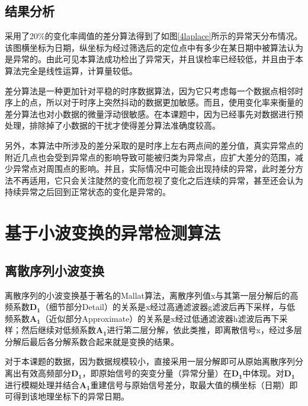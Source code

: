 \documentclass[a4paper,AutoFakeBold,oneside,12pt]{book}
\begin{document}
\subsection{结果分析}
	采用了20\%的变化率阈值的差分算法得到了如图\ref{4laplace}所示的异常天分布情况。该图横坐标为日期，纵坐标为经过筛选后的定位点中有多少在某日期中被算法认为是异常的。由此可见本算法成功检出了异常天，并且误检率已经较低，并且由于本算法完全是线性运算，计算量较低。


	差分算法是一种更加针对平稳的时序数据算法，因为它只考虑每一个数据点相邻时序上的点，所以对于时序上突然抖动的数据更加敏感。而且，使用变化率来衡量的差分算法也对小数据的微量浮动很敏感。在本课题中，因为已经事先对数据进行预处理，排除掉了小数据的干扰才使得差分算法准确度较高。

	另外，本算法中所涉及的差分采取的是时序上左右两点间的差分值，真实异常点的附近几点也会受到异常点的影响导致可能被归类为异常点，应扩大差分的范围，减少异常点对周围点的影响。并且，实际情况中可能会出现持续的异常，此时差分方法不再适用，它只会关注陡然的变化而忽视了变化之后连续的异常，甚至还会认为持续异常之后回到正常状态的变化是异常的。

\section{基于小波变换的异常检测算法}
\subsection{离散序列小波变换}
	离散序列的小波变换基于著名的Mallat算法，离散序列值x与其第一层分解后的高频系数$\bm{D_1}$（细节部分Detail）的关系是x经过高通滤波器g滤波后再下采样，与低频系数$\bm{A_1}$（近似部分Approximate）的关系是x经过低通滤波器h滤波后再下采样；然后继续对低频系数$\bm{A_1}$进行第二层分解，依此类推，即离散信号x，经过多层分解后最后各分解系数合起来就是变换的结果。

	对于本课题的数据，因为数据规模较小，直接采用一层分解即可从原始离散序列分离出有效高频部分$\bm{D_1}$\cite{庄雪鹏2013基于小波的时间序列中异常点的检测}，即原始信号的突变分量（异常分量）在$\bm{D_1}$中体现。对$\bm{D_1}$进行模糊处理并结合$\bm{A_1}$重建信号与原始信号差分\cite{张仁辉2005小波分析在信号去噪中的应用}，取最大值的横坐标（日期）即可得到该地理坐标下的异常日期。
\end{document}
